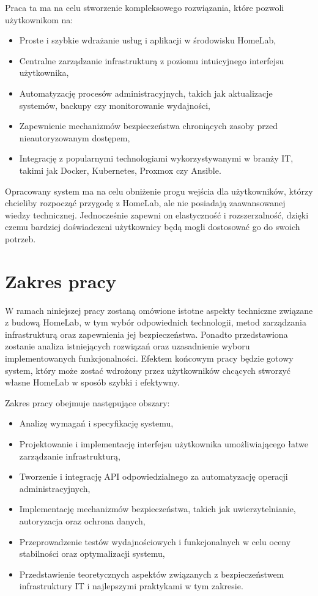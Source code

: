 Praca ta ma na celu stworzenie kompleksowego rozwiązania, które pozwoli użytkownikom na:
\begin{itemize}
    \item Proste i szybkie wdrażanie usług i aplikacji w środowisku HomeLab,
    \item Centralne zarządzanie infrastrukturą z poziomu intuicyjnego interfejsu użytkownika,
    \item Automatyzację procesów administracyjnych, takich jak aktualizacje systemów, backupy czy monitorowanie wydajności,
    \item Zapewnienie mechanizmów bezpieczeństwa chroniących zasoby przed nieautoryzowanym dostępem,
    \item Integrację z popularnymi technologiami wykorzystywanymi w branży IT, takimi jak Docker, Kubernetes, Proxmox czy Ansible.
\end{itemize}

Opracowany system ma na celu obniżenie progu wejścia dla użytkowników, którzy chcieliby rozpocząć przygodę z HomeLab, ale nie posiadają zaawansowanej wiedzy technicznej. Jednocześnie zapewni on elastyczność i rozszerzalność, dzięki czemu bardziej doświadczeni użytkownicy będą mogli dostosować go do swoich potrzeb.

\section{Zakres pracy}

W ramach niniejszej pracy zostaną omówione istotne aspekty techniczne związane z budową HomeLab, w tym wybór odpowiednich technologii, metod zarządzania infrastrukturą oraz zapewnienia jej bezpieczeństwa. Ponadto przedstawiona zostanie analiza istniejących rozwiązań oraz uzasadnienie wyboru implementowanych funkcjonalności. Efektem końcowym pracy będzie gotowy system, który może zostać wdrożony przez użytkowników chcących stworzyć własne HomeLab w sposób szybki i efektywny.

Zakres pracy obejmuje następujące obszary:
\begin{itemize}
    \item Analizę wymagań i specyfikację systemu,
    \item Projektowanie i implementację interfejsu użytkownika umożliwiającego łatwe zarządzanie infrastrukturą,
    \item Tworzenie i integrację API odpowiedzialnego za automatyzację operacji administracyjnych,
    \item Implementację mechanizmów bezpieczeństwa, takich jak uwierzytelnianie, autoryzacja oraz ochrona danych,
    \item Przeprowadzenie testów wydajnościowych i funkcjonalnych w celu oceny stabilności oraz optymalizacji systemu,
    \item Przedstawienie teoretycznych aspektów związanych z bezpieczeństwem infrastruktury IT i najlepszymi praktykami w tym zakresie.
\end{itemize}

